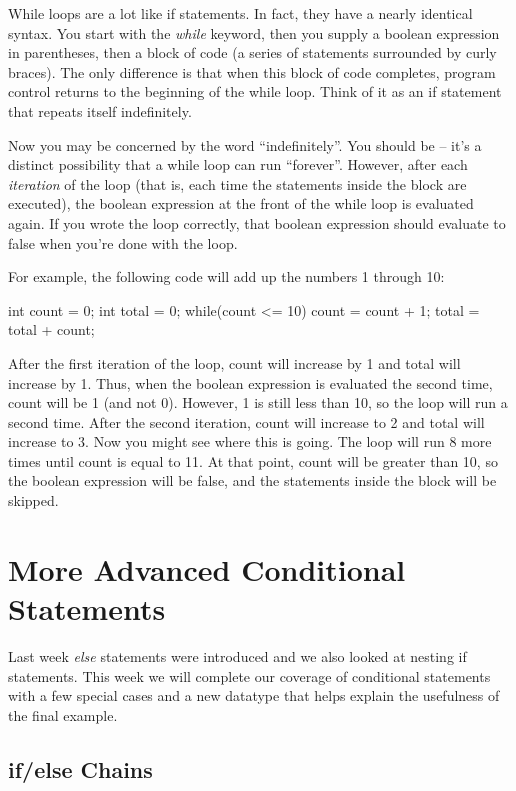 While loops are a lot like if statements. In fact, they have a nearly identical syntax. You start with the \textit{while} keyword, then you supply a boolean expression in parentheses, then a block of code (a series of statements surrounded by curly braces). The only difference is that when this block of code completes, program control returns to the beginning of the while loop. Think of it as an if statement that repeats itself indefinitely.

Now you may be concerned by the word ``indefinitely''. You should be -- it's a distinct possibility that a while loop can run ``forever''. However, after each \textit{iteration} of the loop (that is, each time the statements inside the block are executed), the boolean expression at the front of the while loop is evaluated again. If you wrote the loop correctly, that boolean expression should evaluate to false when you're done with the loop. 

For example, the following code will add up the numbers 1 through 10:

\begin{code}
int count = 0;
int total = 0;
while(count <= 10) {
  count = count + 1;
  total = total + count;
}
\end{code}

After the first iteration of the loop, count will increase by 1 and total will increase by 1. Thus, when the boolean expression is evaluated the second time, count will be 1 (and not 0). However, 1 is still less than 10, so the loop will run a second time. After the second iteration, count will increase to 2 and total will increase to 3. Now you might see where this is going. The loop will run 8 more times until count is equal to 11. At that point, count will be greater than 10, so the boolean expression will be false, and the statements inside the block will be skipped. 

\section{More Advanced Conditional Statements}

Last week \textit{else} statements were introduced and we also looked at nesting if statements. This week we will complete our coverage of conditional statements with a few special cases and a new datatype that helps explain the usefulness of the final example. 

\subsection{if/else Chains}

